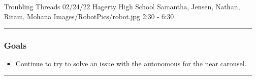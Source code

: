 \insertmeeting 
	{Troubling Threads} 
	{02/24/22} 
	{Hagerty High School}
	{Samantha, Jensen, Nathan, Ritam, Mohana}
	{Images/RobotPics/robot.jpg}
	{2:30 - 6:30}

\noindent\hfil\rule{\textwidth}{.4pt}\hfil
\subsubsection*{Goals}
\begin{itemize}
    \item Continue to try to solve an issue with the autonomous for the near carousel. 

\end{itemize} 

\noindent\hfil\rule{\textwidth}{.4pt}\hfil

